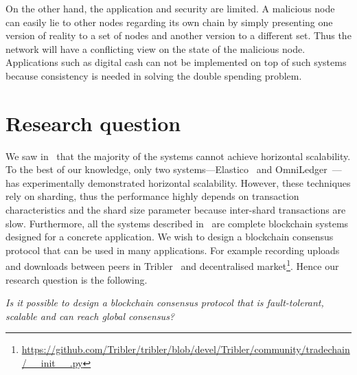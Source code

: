 On the other hand, the application and security are limited.
A malicious node can easily lie to other nodes regarding its own chain by simply presenting one version of reality to a set of nodes and another version to a different set.
Thus the network will have a conflicting view on the state of the malicious node.
Applications such as digital cash can not be implemented on top of such systems because consistency is needed in solving the double spending problem.



\section{Research question}

We saw in~ that the majority of the systems cannot achieve horizontal scalability.
To the best of our knowledge, only two systems---Elastico~\cite{luu2016elastico} and OmniLedger~\cite{kokoris2017omniledger}---has experimentally demonstrated horizontal scalability.
However, these techniques rely on sharding, thus the performance highly depends on transaction characteristics and the shard size parameter because inter-shard transactions are slow.
Furthermore, all the systems described in~ are complete blockchain systems designed for a concrete application.
We wish to design a blockchain consensus protocol that can be used in many applications.
For example recording uploads and downloads between peers in Tribler~\cite{pouwelse2008tribler, multichain} and decentralised market\footnote{\url{https://github.com/Tribler/tribler/blob/devel/Tribler/community/tradechain/__init__.py}}.
Hence our research question is the following.
\begin{displayquote}
\emph{Is it possible to design a blockchain consensus protocol that is fault-tolerant, scalable and can reach global consensus?}
\end{displayquote}

